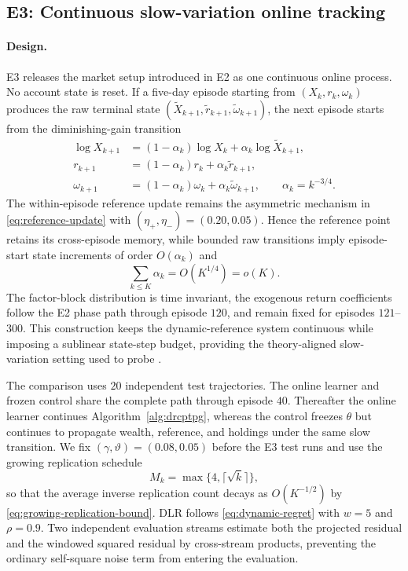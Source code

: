 \subsection{E3: Continuous slow-variation online tracking}\label{sec:e3}
\paragraph{Design.}
E3 releases the market setup introduced in E2 as one continuous online process.  No account state is reset.  If a five-day episode starting from $(X_k,r_k,\omega_k)$ produces the raw terminal state $(\widetilde X_{k+1},\widetilde r_{k+1},\widetilde\omega_{k+1})$, the next episode starts from the diminishing-gain transition
\[
\begin{aligned}
\log X_{k+1}
&=(1-\alpha_k)\log X_k+\alpha_k\log\widetilde X_{k+1},\\
r_{k+1}
&=(1-\alpha_k)r_k+\alpha_k\widetilde r_{k+1},\\
\omega_{k+1}
&=(1-\alpha_k)\omega_k+\alpha_k\widetilde\omega_{k+1},
\qquad
\alpha_k=k^{-3/4}.
\end{aligned}
\]
The within-episode reference update remains the asymmetric mechanism in \eqref{eq:reference-update} with $(\eta_+,\eta_-)=(0.20,0.05)$.  Hence the reference point retains its cross-episode memory, while bounded raw transitions imply episode-start state increments of order $O(\alpha_k)$ and
\[
\sum_{k\le K}\alpha_k=O(K^{1/4})=o(K).
\]
The factor-block distribution is time invariant, the exogenous return coefficients follow the E2 phase path through episode $120$, and remain fixed for episodes $121$--$300$.  This construction keeps the dynamic-reference system continuous while imposing a sublinear state-step budget, providing the theory-aligned slow-variation setting used to probe .

The comparison uses $20$ independent test trajectories.  The online learner and frozen control share the complete path through episode $40$.  Thereafter the online learner continues Algorithm~\ref{alg:drcptpg}, whereas the control freezes $\theta$ but continues to propagate wealth, reference, and holdings under the same slow transition.  We fix $(\gamma,\vartheta)=(0.08,0.05)$ before the E3 test runs and use the growing replication schedule
\[
M_k=\max\{4,\lceil\sqrt{k}\rceil\},
\]
so that the average inverse replication count decays as $O(K^{-1/2})$ by \eqref{eq:growing-replication-bound}.  DLR follows \eqref{eq:dynamic-regret} with $w=5$ and $\rho=0.9$.  Two independent evaluation streams estimate both the projected residual and the windowed squared residual by cross-stream products, preventing the ordinary self-square noise term from entering the evaluation.

